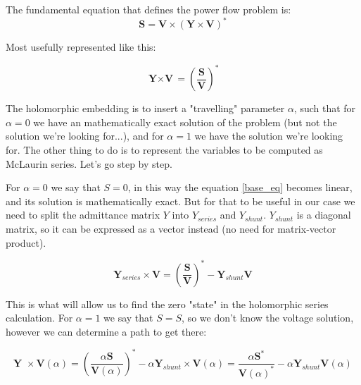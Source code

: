 \documentclass[a4paper,twoside,fleqn]{tufte-book}
\begin{document}
The fundamental equation that defines the power flow problem is:
\begin{equation}
\textbf{S} = \textbf{V} \times (\textbf{Y} \times \textbf{V})^*
\end{equation}

Most usefully represented like this:


\begin{equation}
{\textbf{Y} \times \textbf{V}} = \left(\frac{\textbf{S}}{\textbf{V}}\right)^* 
\label{base_eq}
\end{equation}


The holomorphic embedding is to insert a "travelling" parameter $\alpha$, such that for $\alpha=0$ we have an mathematically exact solution of the problem (but not the solution we're looking for...), and for $\alpha=1$ we have the solution we're looking for. The other thing to do is to represent the variables to be computed as McLaurin series. Let's go step by step.\newline

For $\alpha=0$ we say that $S=0$, in this way the equation \ref{base_eq} becomes linear, and its solution is mathematically exact. But for that to be useful in our case we need to split the admittance matrix $Y$ into $Y_{series}$ and $Y_{shunt}$. $Y_{shunt}$ is a diagonal matrix, so it can be expressed as a vector instead (no need for matrix-vector product).

\begin{equation}
\textbf{Y}_{series} \times \textbf{V} = \left(\frac{\textbf{S}}{\textbf{V}}\right)^* - \textbf{Y}_{shunt} \textbf{V}
\label{base_eq_alpha_0}
\end{equation}

This is what will allow us to find the zero "state" in the holomorphic series calculation. For $\alpha=1$ we say that $S=S$, so we don't know the voltage solution, however we can determine a path to get there:

\begin{equation}
{\textbf{Y }\times \textbf{V}( \alpha )} = \left(\frac{ \alpha\textbf{S}}{\textbf{V}( \alpha )}\right)^* - \alpha \textbf{Y}_{shunt} \times \textbf{V}( \alpha ) = \frac{ \alpha\textbf{S}^*}{\textbf{V}( \alpha )^*} - \alpha \textbf{Y}_{shunt} \textbf{V}( \alpha )
\label{base_eq_embedded}
\end{equation}
\end{document}
